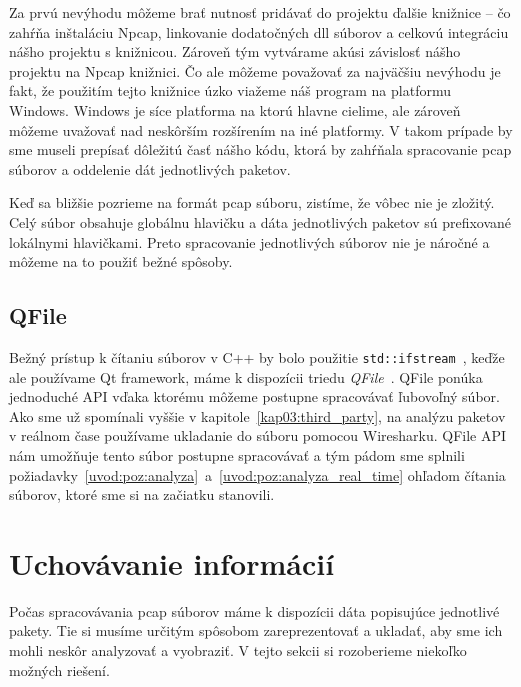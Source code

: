 Za prvú nevýhodu môžeme brať nutnosť pridávať do projektu ďalšie knižnice -- čo zahŕňa inštaláciu Npcap, linkovanie dodatočných dll súborov a celkovú integráciu nášho projektu s knižnicou. Zároveň tým vytvárame akúsi závislosť nášho projektu na Npcap knižnici. Čo ale môžeme považovať za najväčšiu nevýhodu je fakt, že použitím tejto knižnice úzko viažeme náš program na platformu Windows. Windows je síce platforma na ktorú hlavne cielime, ale zároveň môžeme uvažovať nad neskôrším rozšírením na iné platformy. V takom prípade by sme museli prepísať dôležitú časť nášho kódu, ktorá by zahŕňala spracovanie pcap súborov a oddelenie dát jednotlivých paketov.

Keď sa bližšie pozrieme na formát pcap súboru, zistíme, že vôbec nie je zložitý. Celý súbor obsahuje globálnu hlavičku a dáta jednotlivých paketov sú prefixované lokálnymi hlavičkami. Preto spracovanie jednotlivých súborov nie je náročné a môžeme na to použiť bežné spôsoby.

\subsection*{QFile}
Bežný prístup k čítaniu súborov v C++ by bolo použitie \texttt{std::ifstream}~\cite{std_ifstream}, keďže ale používame Qt framework, máme k dispozícii triedu \textit{QFile}~\cite{qfile}. QFile ponúka jednoduché API vďaka ktorému môžeme postupne spracovávať ľubovoľný súbor.
Ako sme už spomínali vyššie v kapitole~\ref{kap03:third_party}, na analýzu paketov v reálnom čase používame ukladanie do súboru pomocou Wiresharku. QFile API nám umožňuje tento súbor postupne spracovávať a tým pádom sme splnili požiadavky~\ref{uvod:poz:analyza}~a~\ref{uvod:poz:analyza_real_time} ohľadom čítania súborov, ktoré sme si na začiatku stanovili.



\section{Uchovávanie informácií}
Počas spracovávania pcap súborov máme k dispozícii dáta popisujúce jednotlivé pakety. Tie si musíme určitým spôsobom zareprezentovať a ukladať, aby sme ich mohli neskôr analyzovať a vyobraziť. V tejto sekcii si rozoberieme niekoľko možných riešení.

